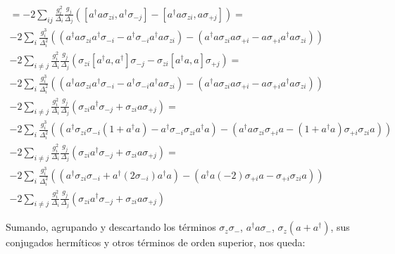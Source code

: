 \begin{multline}
[- 2 \sum\limits_{i} \frac{g_i^2}{\Delta_i} a^\dagger a \sigma_{zi}, \sum\limits_j \frac{g_j} {\Delta_j} (a^\dagger \sigma_{-j} - a \sigma_{+j})] =
- 2 \sum\limits_{ij} \frac{g_i^2}{\Delta_i} \frac{g_j}{\Delta_j} \left(
[a^\dagger a \sigma_{zi}, a^\dagger \sigma_{-j}] -
[a^\dagger a \sigma_{zi}, a \sigma_{+j}]
\right) = \\
- 2 \sum\limits_{i} \frac{g_i^3}{\Delta_i^2} \left(
(a^\dagger a \sigma_{zi} a^\dagger \sigma_{-i} - a^\dagger \sigma_{-i} a^\dagger a \sigma_{zi}) -
(a^\dagger a \sigma_{zi} a \sigma_{+i} - a \sigma_{+i} a^\dagger a \sigma_{zi})
\right) \\
- 2 \sum\limits_{i \neq j} \frac{g_i^2}{\Delta_i} \frac{g_j}{\Delta_j} \left(
\sigma_{zi} [a^\dagger a, a^\dagger] \sigma_{-j} -
\sigma_{zi} [a^\dagger a, a] \sigma_{+j}
\right) = \\
- 2 \sum\limits_{i} \frac{g_i^3}{\Delta_i^2} \left(
(a^\dagger a \sigma_{zi} a^\dagger \sigma_{-i} - a^\dagger \sigma_{-i} a^\dagger a \sigma_{zi}) -
(a^\dagger a \sigma_{zi} a \sigma_{+i} - a \sigma_{+i} a^\dagger a \sigma_{zi})
\right) \\
- 2 \sum\limits_{i \neq j} \frac{g_i^2}{\Delta_i} \frac{g_j}{\Delta_j} \left(
\sigma_{zi} a^\dagger \sigma_{-j} +
\sigma_{zi} a \sigma_{+j}
\right) = \\
- 2 \sum\limits_{i} \frac{g_i^3}{\Delta_i^2} \left(
(a^\dagger \sigma_{zi} \sigma_{-i} (1 + a^\dagger a) - a^\dagger \sigma_{-i} \sigma_{zi} a^\dagger a) -
(a^\dagger a \sigma_{zi} \sigma_{+i} a - (1 + a^\dagger a) \sigma_{+i} \sigma_{zi} a)
\right) \\
- 2 \sum\limits_{i \neq j} \frac{g_i^2}{\Delta_i} \frac{g_j}{\Delta_j} \left(
\sigma_{zi} a^\dagger \sigma_{-j} +
\sigma_{zi} a \sigma_{+j}
\right) = \\
- 2 \sum\limits_{i} \frac{g_i^3}{\Delta_i^2} \left(
(a^\dagger \sigma_{zi} \sigma_{-i} + a^\dagger (2 \sigma_{-i}) a^\dagger a) -
(a^\dagger a (-2) \sigma_{+i} a - \sigma_{+i} \sigma_{zi} a)
\right) \\
- 2 \sum\limits_{i \neq j} \frac{g_i^2}{\Delta_i} \frac{g_j}{\Delta_j} \left(
\sigma_{zi} a^\dagger \sigma_{-j} +
\sigma_{zi} a \sigma_{+j}
\right)
\end{multline}

Sumando, agrupando y descartando los términos $\sigma_z \sigma_-$, $a^\dagger a \sigma_-$, $\sigma_z (a + a^\dagger)$, sus conjugados hermíticos y otros términos de orden superior, nos queda:


